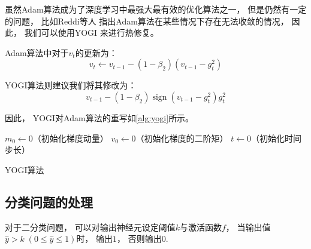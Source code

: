 虽然Adam算法成为了深度学习中最强大最有效的优化算法之一，
但是仍然有一定的问题，
比如Reddi等人\cite{reddiConvergenceAdam2019}
指出Adam算法在某些情况下存在无法收敛的情况，
因此，
我们可以使用YOGI\cite{zaheerAdaptiveMethodsNonconvex2018}
来进行热修复。

Adam算法中对于$v_t$的更新为：
\begin{equation}
    v_t \leftarrow v_{t-1}-\left(1-\beta_{2}\right)\left(v_{t-1}-g_{t}^{2}\right)
\end{equation}

YOGI算法则建议我们将其修改为：
\begin{equation}
    v_{t-1}-\left(1-\beta_{2}\right) \operatorname{sign}\left(v_{t-1}-g_{t}^{2}\right) g_{t}^{2}
\end{equation}

因此，
YOGI对Adam算法的重写如\cref{alg:yogi}所示。

\begin{algorithm}
    \KwData{$\beta_1,\beta_2\in [0,1)$：非负加权参数} %
    $m_0\leftarrow0$（初始化梯度动量）\;
    $v_0\leftarrow0$（初始化梯度的二阶矩）\;
    $t\leftarrow0$（初始化时间步长）\;
    \caption{YOGI算法}\label{alg:yogi}
\end{algorithm}

\subsection{分类问题的处理}

对于二分类问题，
可以对输出神经元设定阈值$k$与激活函数$f$，
当输出值$\hat{y}>k\;(0\leqslant\hat{y}\leqslant1)$时，
输出$1$，
否则输出$0$. %
